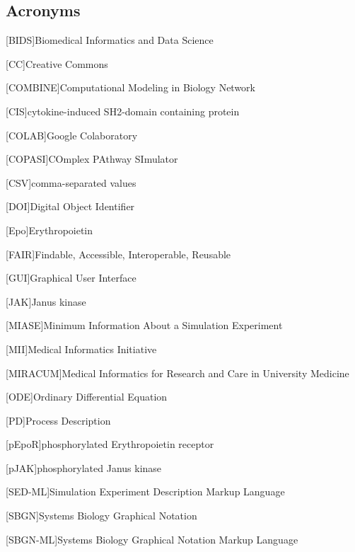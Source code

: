 \subsection*{Acronyms}
    \begin{acronym}[acrmeta]
        
        [BIDS]{Biomedical Informatics and Data Science}
       
       [CC]{Creative Commons}
       
        [COMBINE]{Computational Modeling in Biology Network}
        
        [CIS]{cytokine-induced SH2-domain containing protein}
        
        [COLAB]{Google Colaboratory}
        
        [COPASI]{COmplex PAthway SImulator}
        
        [CSV]{comma-separated values}
        
        [DOI]{Digital Object Identifier}
        
        [Epo]{Erythropoietin}
        
        [FAIR]{Findable, Accessible, Interoperable, Reusable}
        
        [GUI]{Graphical User Interface}
        
        [JAK]{Janus kinase}
        
        [MIASE]{Minimum Information About a Simulation Experiment}
        
        [MII]{Medical Informatics Initiative}
        
        [MIRACUM]{Medical Informatics for Research and Care in University
Medicine}

        [ODE]{Ordinary Differential Equation}

        [PD]{Process Description}
        
        [pEpoR]{phosphorylated Erythropoietin receptor}
        
        [pJAK]{phosphorylated Janus kinase}
        
        [SED-ML]{Simulation Experiment Description Markup Language}
        
        [SBGN]{Systems Biology Graphical Notation}
        
        [SBGN-ML]{Systems Biology Graphical Notation Markup Language}
        

\end{acronym}
